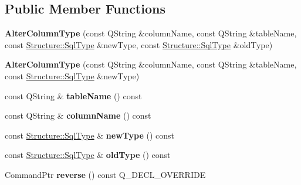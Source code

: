\subsection*{Public Member Functions}
\begin{DoxyCompactItemize}
\item 
\mbox{\label{class_q_sql_migrator_1_1_commands_1_1_alter_column_type_a389a84f882f834feb2f8bc39ac1a52b8}} 
{\bfseries Alter\+Column\+Type} (const Q\+String \&column\+Name, const Q\+String \&table\+Name, const \hyperlink{class_q_sql_migrator_1_1_structure_1_1_sql_type}{Structure\+::\+Sql\+Type} \&new\+Type, const \hyperlink{class_q_sql_migrator_1_1_structure_1_1_sql_type}{Structure\+::\+Sql\+Type} \&old\+Type)
\item 
\mbox{\label{class_q_sql_migrator_1_1_commands_1_1_alter_column_type_af1ea88e297e57ea86738f177353dcc19}} 
{\bfseries Alter\+Column\+Type} (const Q\+String \&column\+Name, const Q\+String \&table\+Name, const \hyperlink{class_q_sql_migrator_1_1_structure_1_1_sql_type}{Structure\+::\+Sql\+Type} \&new\+Type)
\item 
\mbox{\label{class_q_sql_migrator_1_1_commands_1_1_alter_column_type_aabc82e499fd27ec477de757e43526b0c}} 
const Q\+String \& {\bfseries table\+Name} () const
\item 
\mbox{\label{class_q_sql_migrator_1_1_commands_1_1_alter_column_type_ad49f44328b5043e3d0ac17e758d7b427}} 
const Q\+String \& {\bfseries column\+Name} () const
\item 
\mbox{\label{class_q_sql_migrator_1_1_commands_1_1_alter_column_type_a68536ff70a4a6316d10e88ae75dc48bf}} 
const \hyperlink{class_q_sql_migrator_1_1_structure_1_1_sql_type}{Structure\+::\+Sql\+Type} \& {\bfseries new\+Type} () const
\item 
\mbox{\label{class_q_sql_migrator_1_1_commands_1_1_alter_column_type_aac6b416018cd712788934c3768e8d9cc}} 
const \hyperlink{class_q_sql_migrator_1_1_structure_1_1_sql_type}{Structure\+::\+Sql\+Type} \& {\bfseries old\+Type} () const
\item 
\mbox{\label{class_q_sql_migrator_1_1_commands_1_1_alter_column_type_a7c1bd7add836319bb47a184771c22f31}} 
Command\+Ptr {\bfseries reverse} () const Q\+\_\+\+D\+E\+C\+L\+\_\+\+O\+V\+E\+R\+R\+I\+DE
\end{DoxyCompactItemize}

